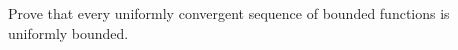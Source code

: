\begin{exercise}
	Prove that every uniformly convergent sequence of bounded functions is uniformly bounded.
\end{exercise}
